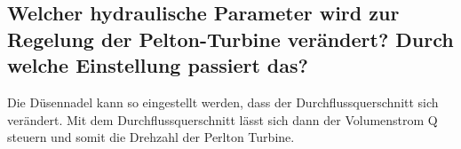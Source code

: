 \subsection{Welcher hydraulische Parameter wird zur Regelung der Pelton-Turbine verändert?
Durch welche Einstellung passiert das?}
Die Düsennadel kann so eingestellt werden, dass der Durchflussquerschnitt sich verändert. Mit dem Durchflussquerschnitt lässt sich dann der Volumenstrom Q steuern und somit die Drehzahl der Perlton Turbine.